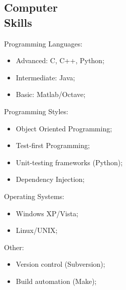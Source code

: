 \documentclass[margin,line]{resume}
\begin{document}
\begin{resume}
    \section{\mysidestyle Computer\\Skills} 

      Programming Languages:
      \begin{itemize}
          \item Advanced: C, C++, Python;
          \item Intermediate: Java;
          \item Basic: Matlab/Octave;
      \end{itemize}

      Programming Styles:
      \begin{itemize}
          \item Object Oriented Programming;
          \item Test-first Programming;
          \item Unit-testing frameworks (Python);
          \item Dependency Injection;
      \end{itemize}

      Operating Systems:
      \begin{itemize}
          \item Windows XP/Vista;
          \item Linux/UNIX;
      \end{itemize}

      Other:
      \begin{itemize}
          \item Version control (Subversion);
          \item Build automation (Make);
      \end{itemize}
    


		
		
			

\end{resume}
\end{document}
